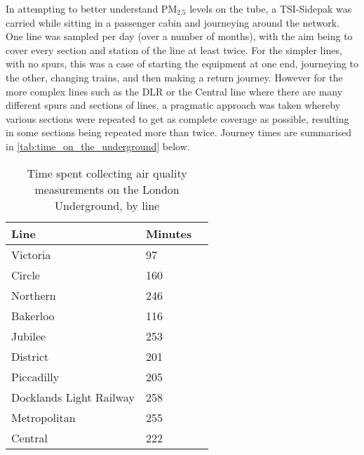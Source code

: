 In attempting to better understand PM$_{2.5}$ levels on the tube, a TSI-Sidepak was carried while sitting in a passenger cabin and journeying around the network. One line was sampled per day (over a number of months), with the aim being to cover every section and station of the line at least twice. For the simpler lines, with no spurs, this was a case of starting the equipment at one end, journeying to the other, changing trains, and then making a return journey. However for the more complex lines such as the DLR or the Central line where there are many different spurs and sections of lines, a pragmatic approach was taken whereby various sections were repeated to get as complete coverage as possible, resulting in some sections being repeated more than twice. Journey times are summarised in \autoref{tab:time_on_the_underground} below.

\begin{table}[H]
\centering
    \begin{tabular}{ | l | l | l |}
    \hline 
    \bfseries{Line} & \bfseries{Minutes} \\ \hline
       Victoria                & 97    \\ \hline
        Circle                  & 160   \\ \hline
        Northern                & 246   \\ \hline
        Bakerloo                & 116   \\ \hline
        Jubilee                 & 253   \\ \hline
        District                & 201   \\ \hline
        Piccadilly              & 205   \\ \hline
        Docklands Light Railway & 258   \\ \hline
        Metropolitan            & 255   \\ \hline
        Central                 & 222   \\ \hline
        \end{tabular}
\caption{Time spent collecting air quality measurements on the London Underground, by line}
\label{tab:time_on_the_underground}
\end{table}

